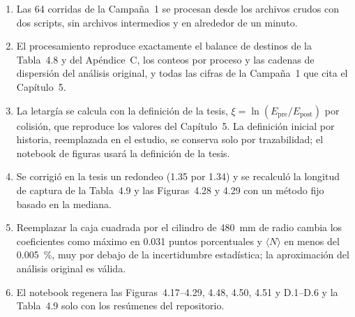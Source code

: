 \documentclass[11pt,a4paper]{article}
\newcommand{\archivo}[1]{\path{#1}}
\begin{document}
\begin{enumerate}
  \item Las 64 corridas de la Campaña~1 se procesan desde los archivos crudos con dos scripts, sin archivos intermedios y en alrededor de un minuto.
  \item El procesamiento reproduce exactamente el balance de destinos de la Tabla~4.8 y del Apéndice~C, los conteos por proceso y las cadenas de dispersión del análisis original, y todas las cifras de la Campaña~1 que cita el Capítulo~5.
  \item La letargía se calcula con la definición de la tesis, $\xi=\ln(E_\mathrm{pre}/E_\mathrm{post})$ por colisión, que reproduce los valores del Capítulo~5. La definición inicial por historia, reemplazada en el estudio, se conserva solo por trazabilidad; el notebook de figuras usará la definición de la tesis.
  \item Se corrigió en la tesis un redondeo (1.35 por 1.34) y se recalculó la longitud de captura de la Tabla~4.9 y las Figuras~4.28 y 4.29 con un método fijo basado en la mediana.
  \item Reemplazar la caja cuadrada por el cilindro de 480~mm de radio cambia los coeficientes como máximo en 0.031 puntos porcentuales y $\langle N\rangle$ en menos del 0.005~\%, muy por debajo de la incertidumbre estadística; la aproximación del análisis original es válida.
  \item El notebook \archivo{figuras_seccion_4.2.ipynb} regenera las Figuras~4.17--4.29, 4.48, 4.50, 4.51 y D.1--D.6 y la Tabla~4.9 solo con los resúmenes del repositorio.
\end{enumerate}
\end{document}
